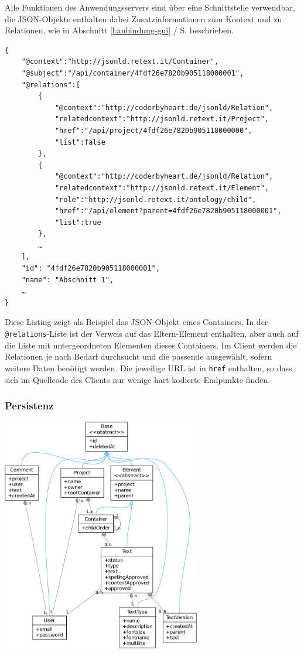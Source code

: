 Alle Funktionen des Anwendungsservers sind über eine Schnittstelle verwendbar, die JSON-Objekte enthalten dabei Zusatzinformationen zum Kontext und zu Relationen, wie in Abschnitt \ref{l:anbindung-gui} / S.\pageref{l:anbindung-gui} beschrieben. 

\begin{samepage}
\begin{verbatim}
{
    "@context":"http://jsonld.retext.it/Container",
    "@subject":"/api/container/4fdf26e7820b905118000001",
    "@relations":[
        {
            "@context":"http://coderbyheart.de/jsonld/Relation",
            "relatedcontext":"http://jsonld.retext.it/Project",
            "href":"/api/project/4fdf26e7820b905118000000",
            "list":false
        },
        {
            "@context":"http://coderbyheart.de/jsonld/Relation",
            "relatedcontext":"http://jsonld.retext.it/Element",
            "role":"http://jsonld.retext.it/ontology/child",
            "href":"/api/element?parent=4fdf26e7820b905118000001",
            "list":true
        },
        …
    ],
    "id": "4fdf26e7820b905118000001",
    "name": "Abschnitt 1",
    …
}
\end{verbatim}

Diese Listing zeigt als Beispiel das JSON-Objekt eines Containers. In der \texttt{@relations}-Liste ist der Verweis auf das Eltern-Element enthalten, aber auch auf die Liste mit untergeordneten Elementen dieses Containers. Im Client werden die Relationen je nach Bedarf durchsucht und die passende ausgewählt, sofern weitere Daten benötigt werden. Die jeweilige URL ist in \texttt{href} enthalten, so dass sich im Quellcode des Clients nur wenige hart-kodierte Endpunkte finden.
\end{samepage}

\subsubsection{Persistenz}

\begin{center}
\includegraphics[width=0.65\textwidth]{media/prototyp-persistenz.pdf}
\end{center}
\label{chart:prototype-persistenz}

